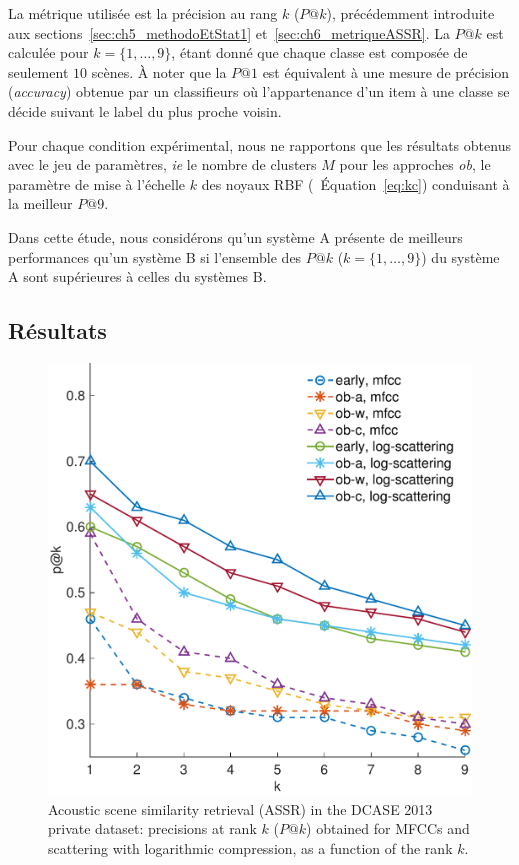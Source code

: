La métrique utilisée est la précision au rang $k$ ($P@k$), précédemment introduite aux sections~\ref{sec:ch5_methodoEtStat1} et~\ref{sec:ch6_metriqueASSR}. La  $P@k$ est calculée pour $k=\lbrace 1,\ldots,9\rbrace$, étant donné que chaque classe est composée de seulement $10$ scènes. À noter que la $P@1$ est équivalent à une mesure de précision (\emph{accuracy}) obtenue par un classifieurs où l'appartenance d'un item à une classe se décide suivant le label du plus proche voisin.

Pour chaque condition expérimental, nous ne rapportons que les résultats obtenus avec le jeu de paramètres, \emph{ie} le nombre de clusters $M$ pour les approches \emph{ob}, le paramètre de mise à l'échelle $k$ des noyaux RBF (\cf~Équation~\ref{eq:kc}) conduisant à la meilleur $P@9$.

Dans cette étude, nous considérons qu'un système A présente de meilleurs performances qu'un système B si l'ensemble des $P@k$ ($k=\lbrace 1,\ldots,9\rbrace$) du système A sont supérieures à celles du systèmes B.

\subsection{Résultats}

\begin{figure}[t]
\begin{center}
\includegraphics[width=.9\columnwidth]{gfx/ch_8/unsupervised_test2-eps-converted-to}
\caption{Acoustic scene similarity retrieval (ASSR) in the DCASE 2013 private dataset: precisions at rank $k$ ($P@k$) obtained for MFCCs and scattering with logarithmic compression, as a function of the rank $k$.}
\label{fig:ASS_1}
\end{center}
\end{figure}

